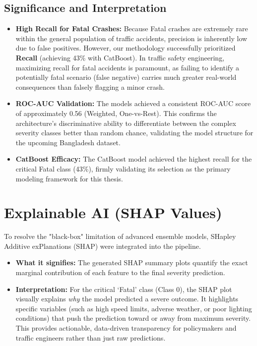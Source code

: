 \documentclass[11pt]{article}
\begin{document}
\subsection{Significance and Interpretation}
\begin{itemize}
    \item \textbf{High Recall for Fatal Crashes:} Because Fatal crashes are extremely rare within the general population of traffic accidents, precision is inherently low due to false positives. However, our methodology successfully prioritized \textbf{Recall} (achieving 43\% with CatBoost). In traffic safety engineering, maximizing recall for fatal accidents is paramount, as failing to identify a potentially fatal scenario (false negative) carries much greater real-world consequences than falsely flagging a minor crash.
    \item \textbf{ROC-AUC Validation:} The models achieved a consistent ROC-AUC score of approximately 0.56 (Weighted, One-vs-Rest). This confirms the architecture's discriminative ability to differentiate between the complex severity classes better than random chance, validating the model structure for the upcoming Bangladesh dataset.
    \item \textbf{CatBoost Efficacy:} The CatBoost model achieved the highest recall for the critical Fatal class (43\%), firmly validating its selection as the primary modeling framework for this thesis.
\end{itemize}

\section{Explainable AI (SHAP Values)}
To resolve the "black-box" limitation of advanced ensemble models, SHapley Additive exPlanations (SHAP) were integrated into the pipeline. 
\begin{itemize}
    \item \textbf{What it signifies:} The generated SHAP summary plots quantify the exact marginal contribution of each feature to the final severity prediction.
    \item \textbf{Interpretation:} For the critical `Fatal' class (Class 0), the SHAP plot visually explains \textit{why} the model predicted a severe outcome. It highlights specific variables (such as high speed limits, adverse weather, or poor lighting conditions) that push the prediction toward or away from maximum severity. This provides actionable, data-driven transparency for policymakers and traffic engineers rather than just raw predictions.
\end{itemize}
\end{document}
